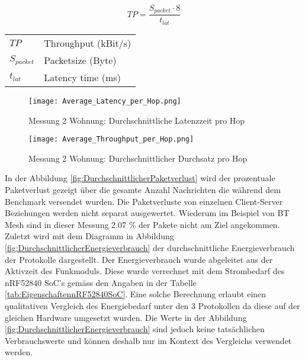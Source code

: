 \begin{equation}\label{eq:BerechnungDurchsatz}
TP =  \frac{S_{packet} \cdot 8}{t_{lat}}
\end{equation}

\begin{small}
\begin{center}
\begin{tabular}{ll}
$TP$ & Throughput (kBit/s)\\
$S_{packet}$ & Packetsize (Byte)\\
$t_{lat}$ & Latency time (ms)\\
\end{tabular}
\end{center}
\end{small}




\begin{figure}[!htbp]
\centering
\begin{minipage}[b]{0.49\textwidth}
		\centering
		\texttt{[image: Average\_Latency\_per\_Hop.png]}
		\caption{Messung 2 Wohnung: Durchschnittliche Latenzzeit pro Hop}
		\label{fig:DurchschnittlicheLatenzzeit}
\end{minipage}
\begin{minipage}[b]{0.49\textwidth}
		\centering
		\texttt{[image: Average\_Throughput\_per\_Hop.png]}
		\caption{Messung 2 Wohnung: Durchschnittlicher Durchsatz pro Hop}
		\label{fig:DurchschnittlicherDurchsatz}
\end{minipage}
\end{figure}

In der Abbildung \ref{fig:DurchschnittlicherPaketverlust} wird der prozentuale Paketverlust gezeigt über die gesamte Anzahl Nachrichten die während dem Benchmark versendet wurden. Die Paketverluste von einzelnen Client-Server Beziehungen werden nicht separat ausgewertet.
Wiederum im Beispiel von BT Mesh sind in dieser Messung 2.07 \% der Pakete nicht am Ziel angekommen.
Zuletzt wird mit dem Diagramm in Abbildung \ref{fig:DurchschnittlicherEnergieverbrauch} der durchschnittliche Energieverbrauch der Protokolle dargestellt.
Der Energieverbrauch wurde abgeleitet aus der Aktivzeit des Funkmoduls. Diese wurde verrechnet mit dem Strombedarf des nRF52840 SoC's gemäss den Angaben in der Tabelle \ref{tab:EigenschaftennRF52840SoC}. Eine solche Berechnung erlaubt einen qualitativen Vergleich des Energiebedarf unter den 3 Protokollen da diese auf der gleichen Hardware umgesetzt wurden. Die Werte in der Abbildung \ref{fig:DurchschnittlicherEnergieverbrauch} sind jedoch keine tatsächlichen Verbrauchswerte und können deshalb nur im Kontext des Vergleichs verwendet werden.


